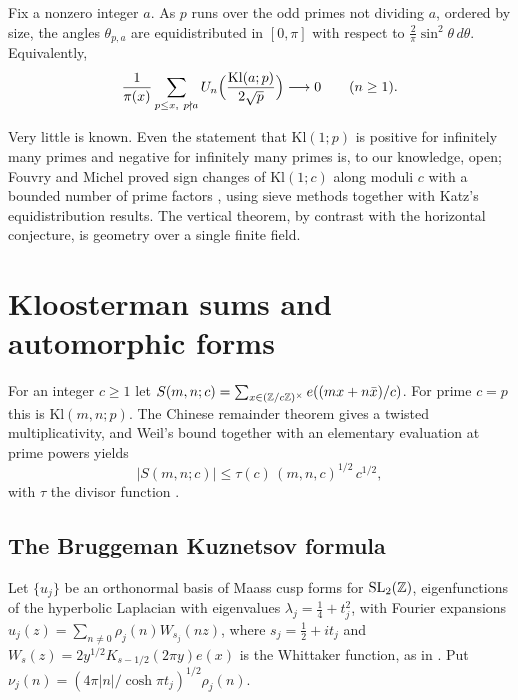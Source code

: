 \begin{conjecture}\label{conj:06bhorizontal}
Fix a nonzero integer $a$. As $p$ runs over the odd primes not dividing $a$, ordered by size, the angles $\theta_{p,a}$ are equidistributed in $[0,\pi]$ with respect to $\frac2\pi\sin^2\theta\,d\theta$. Equivalently,
\[
\frac{1}{\pi(x)}\sum_{p\le x,\ p\nmid a}U_n\Bigl(\frac{\mathrm{Kl}(a;p)}{2\sqrt p}\Bigr)\longrightarrow0\qquad(n\ge1).
\]
\end{conjecture}

Very little is known. Even the statement that $\mathrm{Kl}(1;p)$ is positive for infinitely many primes and negative for infinitely many primes is, to our knowledge, open; Fouvry and Michel proved sign changes of $\mathrm{Kl}(1;c)$ along moduli $c$ with a bounded number of prime factors \cite{fouvrymichel2007}, using sieve methods together with Katz's equidistribution results. The vertical theorem, by contrast with the horizontal conjecture, is geometry over a single finite field.

\section{Kloosterman sums and automorphic forms}\label{sec:06bkuznetsov}

For an integer $c\ge1$ let $S(m,n;c)=\sum_{x\in(\mathbb{Z}/c\mathbb{Z})^\times}e((mx+n\bar x)/c)$. For prime $c=p$ this is $\mathrm{Kl}(m,n;p)$. The Chinese remainder theorem gives a twisted multiplicativity, and Weil's bound together with an elementary evaluation at prime powers yields
\[
|S(m,n;c)|\le\tau(c)\,(m,n,c)^{1/2}\,c^{1/2},
\]
with $\tau$ the divisor function \cite{iwanieckowalski2004}.

\subsection{The Bruggeman Kuznetsov formula}

Let $\{u_j\}$ be an orthonormal basis of Maass cusp forms for $\mathrm{SL}_2(\mathbb{Z})$, eigenfunctions of the hyperbolic Laplacian with eigenvalues $\lambda_j=\frac14+t_j^2$, with Fourier expansions $u_j(z)=\sum_{n\ne0}\rho_j(n)W_{s_j}(nz)$, where $s_j=\frac12+it_j$ and $W_s(z)=2y^{1/2}K_{s-1/2}(2\pi y)e(x)$ is the Whittaker function, as in \cite{iwaniec2002}. Put $\nu_j(n)=(4\pi|n|/\cosh\pi t_j)^{1/2}\rho_j(n)$.

